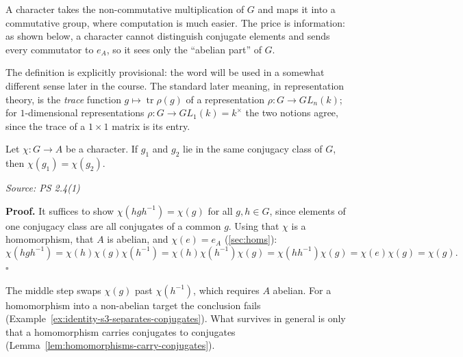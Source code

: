 \documentclass[11pt]{report}
\renewenvironment{proof}[1][Proof]{\noindent\textbf{#1.} }{\hfill$\square$\par\vspace{5pt}}
\newcommand{\srcline}[1]{\par\hfill{\footnotesize\textit{Source: #1}}}
\begin{document}
\begin{rembox}\label{rem:why-characters}
A character takes the non-commutative multiplication of $G$ and maps it into a commutative group, where computation is much easier. The price is information: as shown below, a character cannot distinguish conjugate elements and sends every commutator to $e_A$, so it sees only the ``abelian part'' of $G$.
\end{rembox}

\begin{rembox}\label{rem:word-character}
The definition is explicitly provisional: the word will be used in a somewhat different sense later in the course. The standard later meaning, in representation theory, is the \emph{trace} function $g \mapsto \operatorname{tr}\rho(g)$ of a representation $\rho: G \to GL_n(k)$; for $1$-dimensional representations $\rho: G \to GL_1(k) = k^\times$ the two notions agree, since the trace of a $1 \times 1$ matrix is its entry.
\end{rembox}

\begin{propbox}\label{prop:characters-constant-conjugacy-classes}
Let $\chi: G \to A$ be a character. If $g_1$ and $g_2$ lie in the same conjugacy class of $G$, then $\chi(g_1) = \chi(g_2)$.
\srcline{PS 2.4(1)}
\end{propbox}

\begin{proof}
It suffices to show $\chi(hgh^{-1}) = \chi(g)$ for all $g, h \in G$, since elements of one conjugacy class are all conjugates of a common $g$. Using that $\chi$ is a homomorphism, that $A$ is abelian, and $\chi(e) = e_A$ (\ref{sec:homs}):
\[ \chi(hgh^{-1}) = \chi(h)\chi(g)\chi(h^{-1}) = \chi(h)\chi(h^{-1})\chi(g) = \chi(hh^{-1})\chi(g) = \chi(e)\chi(g) = \chi(g). \]
\end{proof}

\begin{rembox}\label{rem:where-commutativity-a-needed}
The middle step swaps $\chi(g)$ past $\chi(h^{-1})$, which requires $A$ abelian. For a homomorphism into a non-abelian target the conclusion fails (Example~\ref{ex:identity-s3-separates-conjugates}). What survives in general is only that a homomorphism carries conjugates to conjugates (Lemma~\ref{lem:homomorphisms-carry-conjugates}).
\end{rembox}
\end{document}
